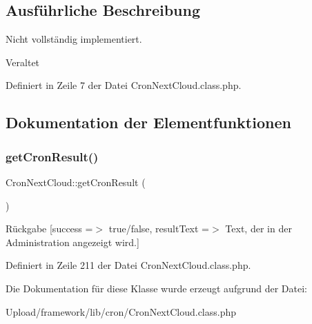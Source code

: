 \subsection{Ausführliche Beschreibung}
Nicht vollständig implementiert. \begin{DoxyRefDesc}{Veraltet}
\item[\mbox{\hyperlink{deprecated__deprecated000009}{Veraltet}}]\end{DoxyRefDesc}


Definiert in Zeile 7 der Datei Cron\+Next\+Cloud.\+class.\+php.



\subsection{Dokumentation der Elementfunktionen}
\mbox{\label{class_cron_next_cloud_a0fd37ee9a76c63bcf9cfe93aa441e7c1}} 
\subsubsection{\texorpdfstring{get\+Cron\+Result()}{getCronResult()}}
{\footnotesize\ttfamily Cron\+Next\+Cloud\+::get\+Cron\+Result (\begin{DoxyParamCaption}{ }\end{DoxyParamCaption})}

\begin{DoxyReturn}{Rückgabe}
\mbox{[}\textquotesingle{}success\textquotesingle{} =$>$ \textquotesingle{}true/false\textquotesingle{}, \textquotesingle{}result\+Text\textquotesingle{} =$>$ \textquotesingle{}Text, der in der Administration angezeigt wird.\textquotesingle{}\mbox{]} 
\end{DoxyReturn}


Definiert in Zeile 211 der Datei Cron\+Next\+Cloud.\+class.\+php.



Die Dokumentation für diese Klasse wurde erzeugt aufgrund der Datei\+:\begin{DoxyCompactItemize}
\item 
Upload/framework/lib/cron/Cron\+Next\+Cloud.\+class.\+php\end{DoxyCompactItemize}
